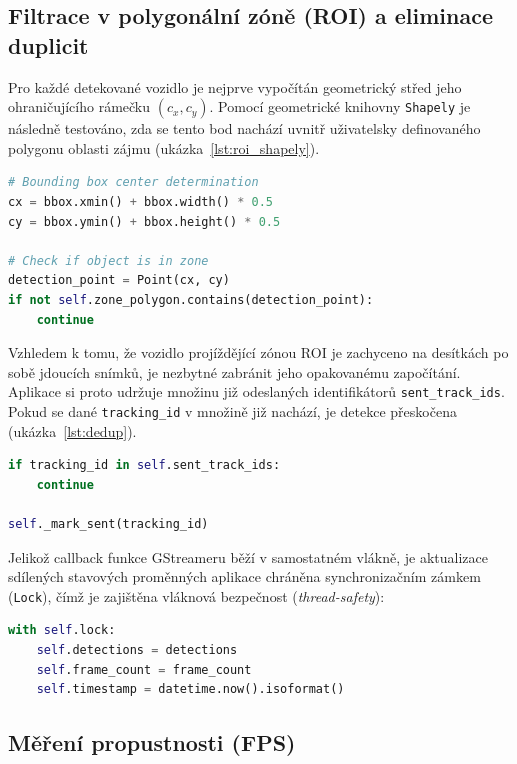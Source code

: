 \documentclass[male,czech,api_bc]{kitheses}
\begin{document}
\subsection{Filtrace v polygonální zóně (ROI) a eliminace duplicit}
Pro každé detekované vozidlo je nejprve vypočítán geometrický střed jeho ohraničujícího rámečku $(c_x, c_y)$. Pomocí geometrické knihovny \texttt{Shapely} je následně testováno, zda se tento bod nachází uvnitř uživatelsky definovaného polygonu oblasti zájmu (ukázka~\ref{lst:roi_shapely}).

\begin{lstlisting}[language=Python, caption={Filtrace detekcí v definované polygonální ROI zóně.}, label={lst:roi_shapely}]
# Bounding box center determination
cx = bbox.xmin() + bbox.width() * 0.5
cy = bbox.ymin() + bbox.height() * 0.5

# Check if object is in zone
detection_point = Point(cx, cy)
if not self.zone_polygon.contains(detection_point):
    continue
\end{lstlisting}

Vzhledem k tomu, že vozidlo projíždějící zónou ROI je zachyceno na desítkách po sobě jdoucích snímků, je nezbytné zabránit jeho opakovanému započítání. Aplikace si proto udržuje množinu již odeslaných identifikátorů \texttt{sent\_track\_ids}. Pokud se dané \texttt{tracking\_id} v množině již nachází, je detekce přeskočena (ukázka~\ref{lst:dedup}).

\begin{lstlisting}[language=Python, caption={Prevence duplicitního odeslání téhož vozidla.}, label={lst:dedup}]
if tracking_id in self.sent_track_ids:
    continue

self._mark_sent(tracking_id)
\end{lstlisting}

Jelikož callback funkce GStreameru běží v samostatném vlákně, je aktualizace sdílených stavových proměnných aplikace chráněna synchronizačním zámkem (\texttt{Lock}), čímž je zajištěna vláknová bezpečnost (\textit{thread-safety}):

\begin{lstlisting}[language=Python, caption={Vláknově bezpečná aktualizace detekčních dat.}]
with self.lock:
    self.detections = detections
    self.frame_count = frame_count
    self.timestamp = datetime.now().isoformat()
\end{lstlisting}

\subsection{Měření propustnosti (FPS)}
\end{document}
